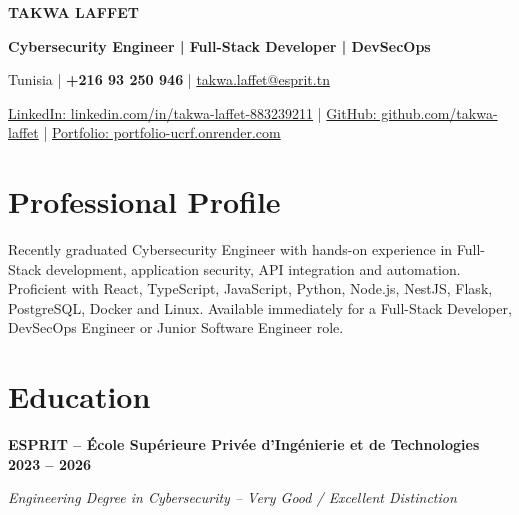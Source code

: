 \documentclass[10pt,a4paper]{article}
\begin{document}

\begin{center}

{\Large \textbf{TAKWA LAFFET}}

\vspace{0pt}

{\small
\textbf{Cybersecurity Engineer | Full-Stack Developer | DevSecOps}
}

\vspace{1pt}

Tunisia \;|\;
\textbf{+216 93 250 946} \;|\;
\href{mailto:takwa.laffet@esprit.tn}{takwa.laffet@esprit.tn}

\vspace{1pt}

\href{https://www.linkedin.com/in/takwa-laffet-883239211/}
{LinkedIn: linkedin.com/in/takwa-laffet-883239211}
\quad|\quad
\href{https://github.com/takwa-laffet}
{GitHub: github.com/takwa-laffet}
\quad|\quad
\href{https://portfolio-ucrf.onrender.com/}
{Portfolio: portfolio-ucrf.onrender.com}

\end{center}


\section*{Professional Profile}

Recently graduated Cybersecurity Engineer with hands-on experience in Full-Stack
development, application security, API integration and automation. Proficient
with React, TypeScript, JavaScript, Python, Node.js, NestJS, Flask, PostgreSQL,
Docker and Linux. Available immediately for a Full-Stack Developer, DevSecOps
Engineer or Junior Software Engineer role.

\section*{Education}

\textbf{ESPRIT -- École Supérieure Privée d'Ingénierie et de Technologies}
\hfill \textbf{2023 -- 2026}

\textit{Engineering Degree in Cybersecurity -- Very Good / Excellent Distinction}
\end{document}
